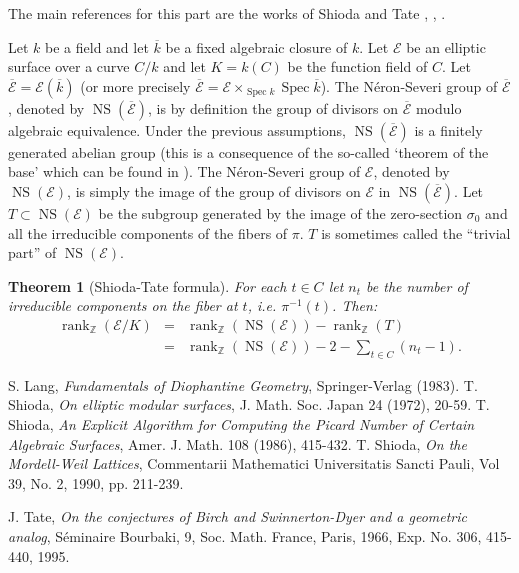 \documentclass[12pt]{article}
\newtheorem*{thm}{Theorem}
\theoremstyle{definition}
\newcommand{\Ints}{\mathbb{Z}}
\newcommand{\E}{\mathcal{E}}
\newcommand{\NS}{\operatorname{NS}(\overline{\E})}
\newcommand{\NSE}{\operatorname{NS}(\E)}
\begin{document}
The main references for this part are the works of Shioda and Tate
\cite{shioda0}, \cite{shioda}, \cite{tate}.

 Let $k$ be a field and let $\overline{k}$ be
a fixed algebraic closure of $k$. Let $\E$ be an elliptic surface over a curve $C/k$ and let $K=k(C)$ be the function field of $C$. Let
$\overline{\E}=\E(\overline{k})$ (or more precisely
$\overline{\E}=\E \times_{\operatorname{Spec} k}
\operatorname{Spec} \overline{k}$). The N\'eron-Severi group of
$\overline{\E}$, denoted by $\NS$, is by definition the group of
divisors on $\overline{\E}$ modulo algebraic equivalence. Under
the previous assumptions, $\NS$ is a finitely generated abelian
group (this is a consequence of the so-called `theorem of the
base' which can be found in \cite{lang}). The N\'eron-Severi group
of $\E$, denoted by $\NSE$, is simply the image of the group of
divisors on $\E$ in $\NS$. Let $T\subset\NSE$ be the subgroup
generated by the image of the zero-section $\sigma_0$ and all the
irreducible components of the fibers of $\pi$. $T$ is sometimes
called the ``trivial part'' of $\NSE$.

\begin{thm}[Shioda-Tate formula]
\label{shioda-tate} For each $t\in C$ let $n_t$ be the number of
irreducible components on the fiber at $t$, i.e. $\pi^{-1}(t)$.
Then:
\begin{eqnarray*}
\operatorname{rank}_{\Ints}(\E/K) &=&
\operatorname{rank}_{\Ints}(\NSE) -
\operatorname{rank}_{\Ints}(T)\\
\nonumber &=& \operatorname{rank}_{\Ints}(\NSE)-2-\sum_{t\in
C}(n_t-1).
\end{eqnarray*}
\end{thm}

\begin{thebibliography}{00}
 S. Lang, {\em Fundamentals of Diophantine
Geometry}, Springer-Verlag (1983).
 T. Shioda, {\em On elliptic modular surfaces}, J. Math. Soc. Japan 24 (1972), 20-59.
 T. Shioda, {\em An Explicit Algorithm for Computing the Picard Number of Certain Algebraic
Surfaces}, Amer. J. Math. 108 (1986), 415-432.
 T. Shioda, {\em On the Mordell-Weil Lattices}, Commentarii Mathematici Universitatis Sancti Pauli,
Vol 39, No. 2, 1990, pp. 211-239.

 J. Tate, {\em On the conjectures of Birch and Swinnerton-Dyer and a geometric analog},
S\'eminaire Bourbaki, 9, Soc. Math. France, Paris, 1966, Exp. No.
306, 415-440, 1995.



\end{thebibliography}
\end{document}

